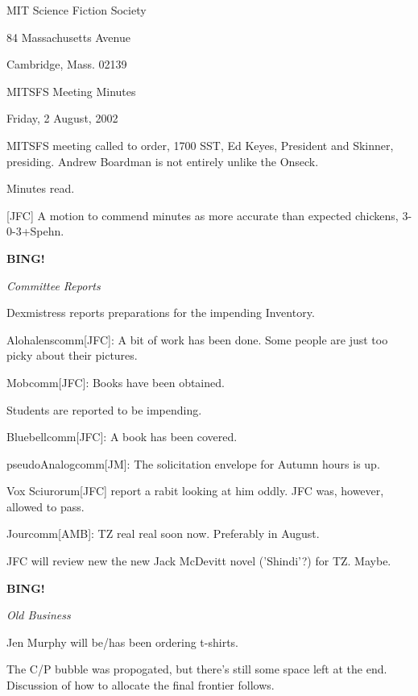 \documentclass[12pt]{article}
\newcommand{\bing}{{\bf BING!} }
\newcommand{\goto}[1]{\bing \vskip 12pt \centerline{{\em{#1}}}}
\begin{document}
\begin{center}

MIT Science Fiction Society 

84 Massachusetts Avenue

Cambridge, Mass.  02139

\vspace{12pt}

MITSFS Meeting Minutes 

Friday, 2 August, 2002

\end{center}
 
\vspace{18pt}

\setlength{\parskip}{6pt}

\noindent
MITSFS meeting called to order, 1700 SST,
Ed Keyes, President and Skinner, presiding.
Andrew Boardman is not entirely unlike the Onseck.

Minutes read.

[JFC] A motion to commend minutes as more accurate than expected
chickens, \hbox{3-0-3+Spehn}.

\goto{Committee Reports}

Dexmistress reports preparations for the impending Inventory.

Alohalenscomm[JFC]: A bit of work has been done.  Some people are just
too picky about their pictures.

Mobcomm[JFC]: Books have been obtained.

Students are reported to be impending.

Bluebellcomm[JFC]: A book has been covered.

pseudoAnalogcomm[JM]: The solicitation envelope for Autumn hours is up.

Vox Sciurorum[JFC] report a rabit looking at him oddly.  JFC was,
however, allowed to pass.

Jourcomm[AMB]: TZ real real soon now.  Preferably in August.

JFC will review new the new Jack McDevitt novel ('Shindi'?) for TZ.  Maybe.

\vspace{12pt}

\goto{Old Business}

Jen Murphy will be/has been ordering t-shirts.

The C/P bubble was propogated, but there's still some space left at the
end.  Discussion of how to allocate the final frontier follows.
\end{document}
